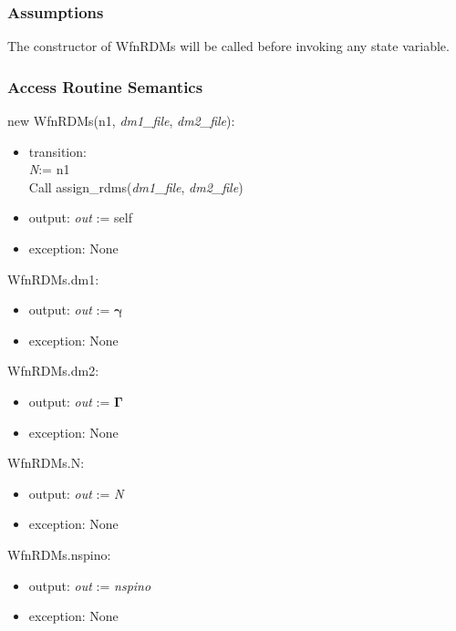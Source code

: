 \documentclass[12pt, titlepage]{article}
\begin{document}
\subsubsection{Assumptions}

The constructor of WfnRDMs will be called before invoking any state variable.

\subsubsection{Access Routine Semantics}

\noindent new WfnRDMs(n1, \textit{dm1\_file}, \textit{dm2\_file}):
\begin{itemize}
	\item transition: \\
	\textit{N}:= n1\\
	Call assign\_rdms(\textit{dm1\_file}, \textit{dm2\_file})
	\item output: \textit{out} := self 
	\item exception: None 
\end{itemize}

\noindent WfnRDMs.dm1:
\begin{itemize}
	\item output: \textit{out} := $\boldsymbol{\gamma}$ 
	\item exception: None 
\end{itemize}

\noindent WfnRDMs.dm2:
\begin{itemize}
	\item output: \textit{out} := $\boldsymbol{\Gamma}$ 
	\item exception: None 
\end{itemize}

\noindent WfnRDMs.N:
\begin{itemize}
	\item output: \textit{out} := \textit{N} 
	\item exception: None 
\end{itemize}

\noindent WfnRDMs.nspino:
\begin{itemize}
	\item output: \textit{out} := \textit{nspino} 
	\item exception: None 
\end{itemize}
\end{document}
